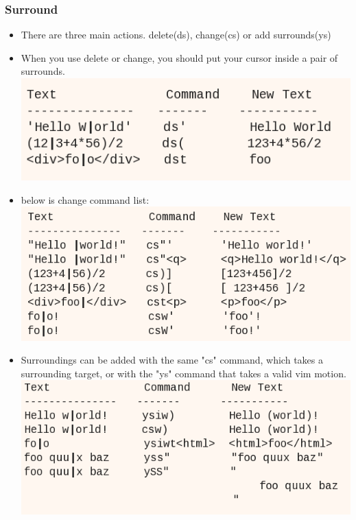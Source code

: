 \documentclass[a4paper,12pt,twoside]{book}
\begin{document}
\subsubsection{Surround}
\begin{itemize}
		\item There are three main actions. delete(ds), change(cs) or add surrounds(ys)

		\item When you use delete or change, you should put your cursor inside a pair of surrounds.\\

		\includegraphics[scale=0.4]{pics/surround1.png} \\

	\item below is change command list: \\

	\includegraphics[scale=0.4]{pics/surround2.png} \\
		
		\item Surroundings can be added with the same "cs" command, which takes a surrounding target, or with the "ys" command that takes a valid vim motion. \\

			\includegraphics[scale=0.4]{pics/surround3.png} \\
	   

\end{itemize}
\end{document}
